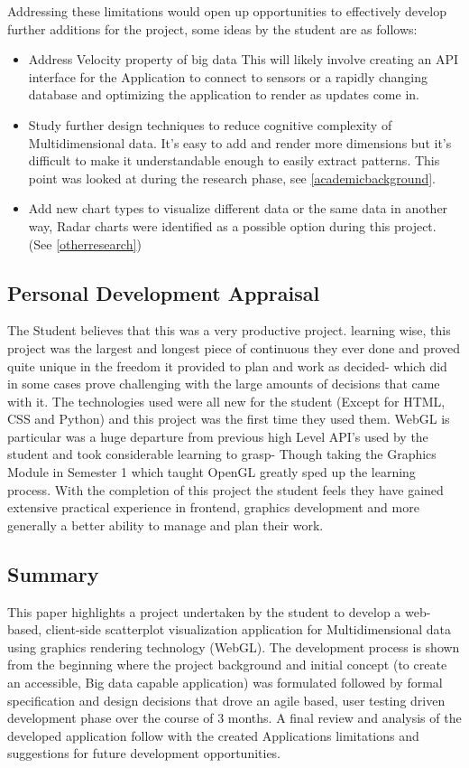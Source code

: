 Addressing these limitations would open up opportunities to effectively develop further additions for the project, some ideas by the student are as follows:

\begin{itemize}
    \item Address Velocity property of big data \cite{7918044} This will likely involve creating an API interface for the Application to connect to sensors or a rapidly changing database and optimizing the application to render as updates come in.
    \item Study further design techniques to reduce cognitive complexity of Multidimensional data. It's easy to add and render more dimensions but it's difficult to make it understandable enough to easily extract patterns. This point was looked at during the research phase, see \ref{academicbackground}.
    \item Add new chart types to visualize different data or the same data in another way, Radar charts were identified as a possible option during this project. (See \ref{otherresearch})
\end{itemize}

\subsection{Personal Development Appraisal}
The Student believes that this was a very productive project. learning wise, this project was the largest and longest piece of continuous they ever done and proved quite unique in the freedom it provided to plan and work as decided- which did in some cases prove challenging with the large amounts of decisions that came with it. The technologies used were all new for the student (Except for HTML, CSS and Python) and this project was the first time they used them. WebGL is particular was a huge departure from previous high Level API's used by the student and took considerable learning to grasp- Though taking the Graphics Module in Semester 1 which taught OpenGL greatly sped up the learning process.
With the completion of this project the student feels they have gained extensive practical experience in frontend, graphics development and more generally a better ability to  manage and plan their work.

\subsection{Summary}
This paper highlights a project undertaken by the student to develop a web-based, client-side scatterplot visualization application for Multidimensional data using graphics rendering technology (WebGL). The development process is shown from the beginning where the project background and initial concept (to create an accessible, Big data capable application) was formulated followed by formal specification and design decisions that drove an agile based, user testing driven development phase over the course of 3 months. A final review and analysis of the developed application follow with the created Applications limitations and suggestions for future development opportunities.

